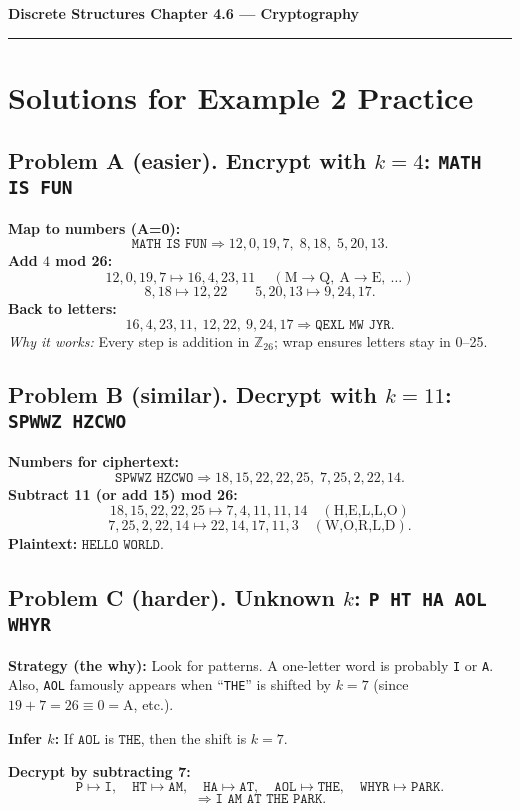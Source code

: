 \documentclass[12pt]{article}
\begin{document}
{\large \textbf{Discrete Structures \quad Chapter 4.6 — Cryptography}}

\hrule
\vspace{0.6em}

\section*{Solutions for Example 2 Practice}

\subsection*{Problem A (easier). \quad Encrypt with \(k=4\): \texttt{MATH IS FUN}}
\textbf{Map to numbers (A=0):}
\[
\texttt{MATH IS FUN} \Rightarrow 12,0,19,7,\; 8,18,\; 5,20,13.
\]
\textbf{Add \(4\) mod 26:}
\[
12,0,19,7 \mapsto 16,4,23,11 \quad\ (\text{M}\to\text{Q},\ \text{A}\to\text{E},\ \ldots)
\]
\[
8,18 \mapsto 12,22 \qquad 5,20,13 \mapsto 9,24,17.
\]
\textbf{Back to letters:}
\[
16,4,23,11, \ 12,22, \ 9,24,17 \Rightarrow \boxed{\texttt{QEXL MW JYR}}.
\]
\emph{Why it works:} Every step is addition in \(\mathbb{Z}_{26}\); wrap ensures letters stay in 0–25.

\bigskip

\subsection*{Problem B (similar). \quad Decrypt with \(k=11\): \texttt{SPWWZ HZCWO}}
\textbf{Numbers for ciphertext:}
\[
\texttt{SPWWZ HZCWO} \Rightarrow 18,15,22,22,25,\; 7,25,2,22,14.
\]
\textbf{Subtract 11 (or add 15) mod 26:}
\[
18,15,22,22,25 \mapsto 7,4,11,11,14 \quad (\text{H,E,L,L,O})
\]
\[
7,25,2,22,14 \mapsto 22,14,17,11,3 \quad (\text{W,O,R,L,D}).
\]
\textbf{Plaintext:} \(\boxed{\texttt{HELLO WORLD}}\).

\bigskip

\subsection*{Problem C (harder). \quad Unknown \(k\): \texttt{P HT HA AOL WHYR}}
\textbf{Strategy (the why):} Look for patterns. A one-letter word is probably \texttt{I} or \texttt{A}. Also, \texttt{AOL} famously appears when ``\texttt{THE}'' is shifted by \(k=7\) (since \(19{+}7=26\equiv 0=\text{A}\), etc.).

\textbf{Infer \(k\):} If \(\texttt{AOL}\) is \(\texttt{THE}\), then the shift is \(k=7\).

\textbf{Decrypt by subtracting 7:}
\[
\texttt{P} \mapsto \texttt{I},\quad
\texttt{HT} \mapsto \texttt{AM},\quad
\texttt{HA} \mapsto \texttt{AT},\quad
\texttt{AOL} \mapsto \texttt{THE},\quad
\texttt{WHYR} \mapsto \texttt{PARK}.
\]
\[
\Rightarrow \boxed{\texttt{I AM AT THE PARK}}.
\]
\end{document}
